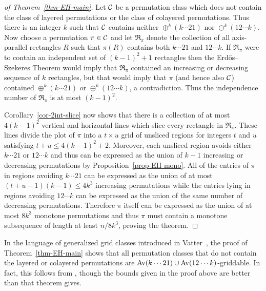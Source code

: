 \documentclass[
final
, nomarks
]{dmtcs-episciences}
\begin{document}
\begin{proof}[of Theorem~\ref{thm-EH-main}]
Let $\mathcal{C}$ be a permutation class which does not contain the class of layered permutations or the class of colayered permutations. Thus there is an integer $k$ such that $\mathcal{C}$ contains neither $\oplus^k (k\cdots 21)$ nor $\ominus^k (12\cdots k)$. Now choose a permutation $\pi\in\mathcal{C}$ and let $\mathfrak{R}_\pi$ denote the collection of all axis-parallel rectangles $R$ such that $\pi(R)$ contains both $k\cdots 21$ and $12\cdots k$. If $\mathfrak{R}_\pi$ were to contain an independent set of $(k-1)^2+1$ rectangles then the Erd\H{o}s--Szekeres Theorem would imply that $\mathfrak{R}_\pi$ contained an increasing or decreasing sequence of $k$ rectangles, but that would imply that $\pi$ (and hence also $\mathcal{C}$) contained $\oplus^k (k\cdots 21)$ or $\ominus^k (12\cdots k)$, a contradiction. Thus the independence number of $\mathfrak{R}_\pi$ is at most $(k-1)^2$.

Corollary~\ref{cor-2int-slice} now shows that there is a collection of at most $4(k-1)^2$ vertical and horizontal lines which slice every rectangle in $\mathfrak{R}_\pi$. These lines divide the plot of $\pi$ into a $t\times u$ grid of unsliced regions for integers $t$ and $u$ satisfying $t+u\le 4(k-1)^2+2$. Moreover, each unsliced region avoids either $k\cdots 21$ or $12\cdots k$ and thus can be expressed as the union of $k-1$ increasing or decreasing permutations by Proposition~\ref{prop-EH-mono}. All of the entries of $\pi$ in regions avoiding $k\cdots 21$ can be expressed as the union of at most $(t+u-1)(k-1)\le 4k^3$ increasing permutations while the entries lying in regions avoiding $12\cdots k$ can be expressed as the union of the same number of decreasing permutations. Therefore $\pi$ itself can be expressed as the union of at most $8k^3$ monotone permutations and thus $\pi$ must contain a monotone subsequence of length at least $n/8k^3$, proving the theorem.
\end{proof}

In the language of generalized grid classes introduced in Vatter~\cite{vatter:small-permutati:}, the proof of Theorem~\ref{thm-EH-main} shows that all permutation classes that do not contain the layered or colayered permutations are $\operatorname{Av}(k\cdots 21)\cup\operatorname{Av}(12\cdots k)$-griddable. In fact, this follows from \cite[Theorem 3.1]{vatter:small-permutati:}, though the bounds given in the proof above are better than that theorem gives.
\end{document}
